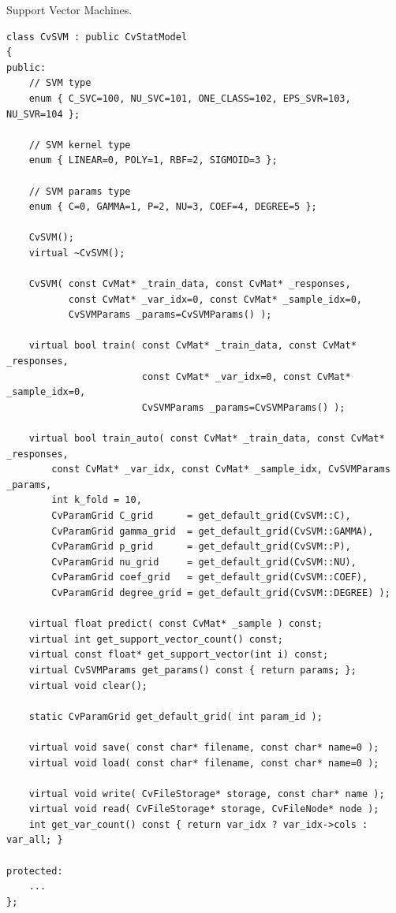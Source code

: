 Support Vector Machines.

\begin{lstlisting}
class CvSVM : public CvStatModel
{
public:
    // SVM type
    enum { C_SVC=100, NU_SVC=101, ONE_CLASS=102, EPS_SVR=103, NU_SVR=104 };

    // SVM kernel type
    enum { LINEAR=0, POLY=1, RBF=2, SIGMOID=3 };

    // SVM params type
    enum { C=0, GAMMA=1, P=2, NU=3, COEF=4, DEGREE=5 };

    CvSVM();
    virtual ~CvSVM();

    CvSVM( const CvMat* _train_data, const CvMat* _responses,
           const CvMat* _var_idx=0, const CvMat* _sample_idx=0,
           CvSVMParams _params=CvSVMParams() );

    virtual bool train( const CvMat* _train_data, const CvMat* _responses,
                        const CvMat* _var_idx=0, const CvMat* _sample_idx=0,
                        CvSVMParams _params=CvSVMParams() );

    virtual bool train_auto( const CvMat* _train_data, const CvMat* _responses,
        const CvMat* _var_idx, const CvMat* _sample_idx, CvSVMParams _params,
        int k_fold = 10,
        CvParamGrid C_grid      = get_default_grid(CvSVM::C),
        CvParamGrid gamma_grid  = get_default_grid(CvSVM::GAMMA),
        CvParamGrid p_grid      = get_default_grid(CvSVM::P),
        CvParamGrid nu_grid     = get_default_grid(CvSVM::NU),
        CvParamGrid coef_grid   = get_default_grid(CvSVM::COEF),
        CvParamGrid degree_grid = get_default_grid(CvSVM::DEGREE) );

    virtual float predict( const CvMat* _sample ) const;
    virtual int get_support_vector_count() const;
    virtual const float* get_support_vector(int i) const;
    virtual CvSVMParams get_params() const { return params; };
    virtual void clear();

    static CvParamGrid get_default_grid( int param_id );

    virtual void save( const char* filename, const char* name=0 );
    virtual void load( const char* filename, const char* name=0 );

    virtual void write( CvFileStorage* storage, const char* name );
    virtual void read( CvFileStorage* storage, CvFileNode* node );
    int get_var_count() const { return var_idx ? var_idx->cols : var_all; }

protected:
    ...
};
\end{lstlisting}



